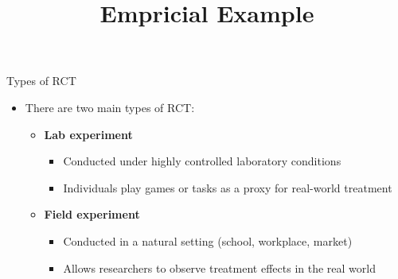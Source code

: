 \documentclass[hyperref={pdfpagelabels=false}]{beamer}
\begin{document}
	\begin{frame}{Types of RCT}
		\begin{itemize}
			\item There are two main types of RCT:
			\vspace{0.2cm}
			\begin{itemize}
				\item[1] \textbf{Lab experiment}
				\vspace{0.2cm}
				\begin{itemize}
					\item Conducted under highly controlled laboratory conditions
					\vspace{0.1cm}
					\item Individuals play games or tasks as a proxy for real-world treatment
				\end{itemize}
				\vspace{0.3cm}
				\item[2] \textbf{Field experiment}
				\vspace{0.2cm}
				\begin{itemize}
					\item Conducted in a natural setting (school, workplace, market)
					\vspace{0.1cm}
					\item Allows researchers to observe treatment effects in the real world
				\end{itemize}
			\end{itemize}
		\end{itemize}
	\end{frame}




\title[]  
{Empricial Example}


\author 
{}

\institute{}






\date
{}


\begin{frame}{}
	\titlepage
\end{frame}
	
    
\end{document}
